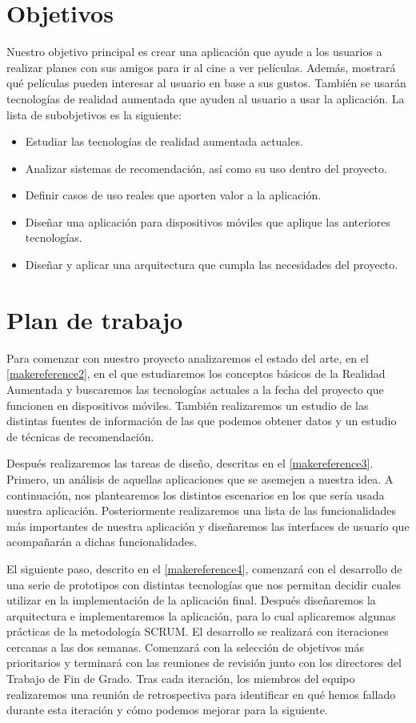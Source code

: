 \section{Objetivos}
\label{makereference1.2}
Nuestro objetivo principal es crear una aplicación que ayude a los usuarios a
realizar planes con sus amigos para ir al cine a ver películas. Además,
mostrará qué películas pueden interesar al usuario en base a sus gustos.
También se usarán tecnologías de realidad aumentada que ayuden al usuario a usar
la aplicación.
La lista de subobjetivos es la siguiente:
\begin{itemize}  
    \item Estudiar las tecnologías de realidad aumentada actuales.
    \item Analizar sistemas de recomendación, así como su uso dentro del
     proyecto.
    \item Definir casos de uso reales que aporten valor a la aplicación.
    \item Diseñar una aplicación para dispositivos móviles que aplique las
     anteriores tecnologías.
    \item Diseñar y aplicar una arquitectura que cumpla las necesidades del
     proyecto.
\end{itemize}

\section{Plan de trabajo}
\label{makereference1.3}

Para comenzar con nuestro proyecto analizaremos el estado del arte, en el
 \autoref{makereference2}, en el que estudiaremos los conceptos básicos de la
 Realidad Aumentada y buscaremos las tecnologías actuales a la fecha del proyecto
 que funcionen en dispositivos móviles. También realizaremos un estudio de las distintas
 fuentes de información de las que podemos obtener datos y un estudio de
 técnicas de recomendación.

Después realizaremos las tareas de diseño, descritas en el
 \autoref{makereference3}. Primero, un análisis de aquellas aplicaciones que se
 asemejen a nuestra idea. A continuación, nos plantearemos los distintos
 escenarios en los que sería usada nuestra aplicación. Posteriormente
 realizaremos una lista de las funcionalidades más importantes de nuestra
 aplicación y diseñaremos las interfaces de usuario que acompañarán a dichas
 funcionalidades. 
   
El siguiente paso, descrito en el \autoref{makereference4}, comenzará con
 el desarrollo de una serie de prototipos con distintas tecnologías que nos permitan
 decidir cuales utilizar en la implementación de la aplicación final. Después diseñaremos la
 arquitectura e implementaremos la aplicación, para lo cual aplicaremos algunas
 prácticas de la metodología SCRUM. El desarrollo se realizará con iteraciones
 cercanas a las dos semanas. Comenzará con la selección de objetivos más
 prioritarios y terminará con las reuniones de revisión junto con los directores
 del Trabajo de Fin de Grado. Tras cada iteración, los miembros del equipo
 realizaremos una reunión de retrospectiva para identificar en qué hemos fallado
 durante esta iteración y cómo podemos mejorar para la siguiente.

